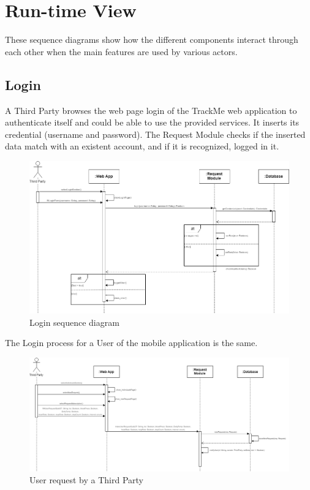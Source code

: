 \section{Run-time View}
These sequence diagrams show how the different components interact through each other when the main features are used by various actors.
\subsection{Login}
A Third Party browses the web page login of the TrackMe web application to authenticate itself and could be able to use the provided services. It inserts its credential (username and password). The Request Module checks if the inserted data match with an existent account, and if it is recognized, logged in it.
\begin{figure}[H]
    \centering
    \includegraphics[scale=0.35]{DD/Pictures/login.png}
    \caption{Login sequence diagram}
\end{figure}
The Login process for a User of the mobile application is the same.
\begin{figure}[H]
    \centering
    \includegraphics[scale=0.35]{DD/Pictures/userRequest.png}
    \caption{User request by a Third Party}
\end{figure}

